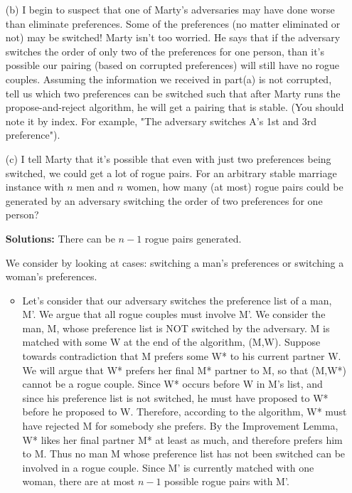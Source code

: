 \documentclass[11pt]{article}
\newif\ifsolutions
\renewcommand{\answer}[1]{{\color{mydarkblue}\textbf{Solutions: }#1}}
\begin{document}
\begin{qunlist}
\begin{itemize}
\newpage
        
\item[(b)] I begin to suspect that one of Marty's adversaries may have done worse than eliminate preferences. 
Some of the preferences (no matter eliminated or not) may be switched! Marty isn't too worried. 
He says that if the adversary switches the order of only two of the preferences for one person, 
than it's possible our pairing (based on corrupted preferences) will still have no rogue couples. 
Assuming the information we received in part(a) is not corrupted, 
tell us which two preferences can be switched such that after Marty runs the propose-and-reject algorithm, 
he will get a pairing that is stable. 
(You should note it by index. For example, "The adversary switches A's 1st and 3rd preference").

\ifsolutions
\answer{
There are three solutions. 
We can either switch Man 2's 2nd and 3rd preferences, Man 3's 2nd and 3rd preferences, 
or Woman C's 1st and 2nd preferences. 
If any of these three sets of swithes occur, the algorithm will still return no rogue couples. 
This questions is meant as an elaboration on the previous part in order to 
get you to think about how some parts of preference lists 
may not actually affect the outcome of the traditional propose-and-reject algorithm.
}
\fi

        
\item[(c)] I tell Marty that it's possible that even with just two preferences being switched, 
we could get a lot of rogue pairs. For an arbitrary stable marriage instance with $n$ men and $n$ women, 
how many (at most) rogue pairs could be generated 
by an adversary switching the order of two preferences for one person?

\ifsolutions
\answer{
There can be $n-1$ rogue pairs generated. 

We consider by looking at cases: switching a man's preferences or switching a woman's preferences. 
\begin{itemize}
\item Let's consider that our adversary switches the preference list of a man, M'. 
We argue that all rogue couples must involve M'.
We consider the man, M, whose preference list is NOT switched by the adversary. 
M is matched with some W at the end of the algorithm, (M,W). 
Suppose towards contradiction that M prefers some W* to his current partner W. 
We will argue that W* prefers her final M* partner to M, so that (M,W*) cannot be a rogue couple.  Since W* occurs before W in M's list, and since his preference list is not switched, 
he must have proposed to W* before he proposed to W. 
Therefore, according to the algorithm, W* must have rejected M for somebody she prefers. 
By the Improvement Lemma, W* likes her final partner M* at least as much, and therefore prefers him to M.
Thus no man M whose preference list has not been switched can be involved in a rogue couple. 
Since M' is currently matched with one woman, there are at most $n-1$ possible rogue pairs with M'. 


\end{itemize}}
\end{itemize}
\end{qunlist}
\end{document}
